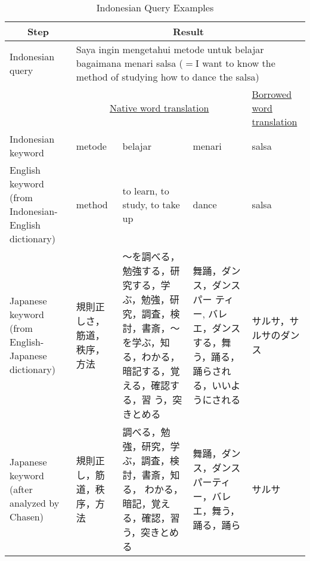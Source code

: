\documentclass[english]{jnlp_1.3c}
\begin{document}
\begin{table}[t]
  \caption{Indonesian Query Examples}
  \label{table:query_examples}
  \begin{center}
    \begin{small}
    \begin{tabular}{|l|l|l|l|l|}\hline
     \multicolumn{1}{|c|}{Step} & \multicolumn{4}{|c|}{Result} \\ \hline 
     \multicolumn{1}{|p{8em}|}{Indonesian query} &
     \multicolumn{4}{|p{33em}|}{Saya ingin mengetahui metode untuk
     belajar bagaimana menari salsa ($=$I want to know the method of
     studying how to dance the salsa)} \\ \hline
     {} & \multicolumn{3}{|c|}{\underline{Native word translation}} &
     \multicolumn{1}{|p{6em}|}{\underline{Borrowed word translation}} \\
     \hline
     \multicolumn{1}{|p{9em}|}{Indonesian keyword} &
     metode & belajar & menari & salsa \\ \hline
     \multicolumn{1}{|p{9em}|}{English keyword (from Indonesian-English
     dictionary)} & method & \multicolumn{1}{|p{6em}|}{to learn, to
     study, to take up} & dance & salsa \\ \hline
     \multicolumn{1}{|p{9em}|}{Japanese keyword (from English-Japanese
     dictionary)} & \multicolumn{1}{|p{6em}|}{規則正しさ，筋道，秩序，方法}
     & \multicolumn{1}{|p{6em}|}{〜を調べる，勉強する，研究する，学ぶ，勉強，研
     究，調査，検討，書斎，〜を学ぶ，知る，わかる，暗記する，覚える，確認する，習
     う，突きとめる} & \multicolumn{1}{|p{6em}|}{舞踊，ダンス，ダンスパー
     ティー,
     バレエ，ダンスする，舞う，踊る，踊らされる，いいようにされる} &
     \multicolumn{1}{|p{10em}|}{サルサ，サルサのダンス} \\ \hline
     \multicolumn{1}{|p{9em}|}{Japanese keyword (after analyzed by
     Chasen)} & \multicolumn{1}{|p{6em}|}{規則正し，筋道，秩序，方法} &
     \multicolumn{1}{|p{6em}|}{調べる，勉強，研究，学ぶ，調査，検討，書斎，知る，
     わかる，暗記，覚える，確認，習う，突きとめる} &
     \multicolumn{1}{|p{6em}|}{舞踊，ダンス，ダンスパーティー，バレエ，舞う，
     踊る，踊ら} & サルサ \\ \hline
    \end{tabular}
    \end{small}
  \end{center}
\end{table}
\end{document}
